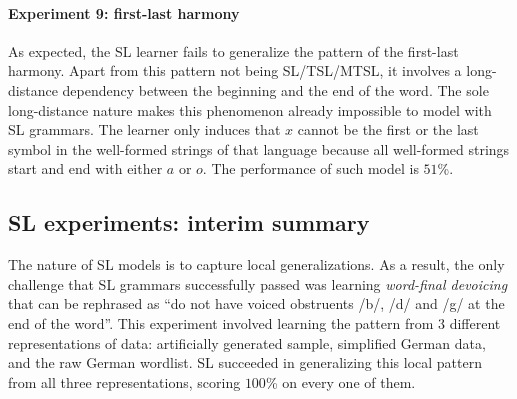 \paragraph{Experiment 9: first-last harmony}

As expected, the SL learner fails to generalize the pattern of the first-last harmony.
Apart from this pattern not being SL/TSL/MTSL, it involves a long-distance dependency between the beginning and the end of the word.
The sole long-distance nature makes this phenomenon already impossible to model with SL grammars.
The learner only induces that $x$ cannot be the first or the last symbol in the well-formed strings of that language because all well-formed strings start and end with either $a$ or $o$.
The performance of such model is $51$\%.

\begin{table}[h!]
\centering
{}
\caption{SL learning of first-last harmony; abstract representation.}
\end{table}


\subsection{SL experiments: interim summary}

The nature of SL models is to capture local generalizations.
As a result, the only challenge that SL grammars successfully passed was learning \emph{word-final devoicing} that can be rephrased as ``do not have voiced obstruents /b/, /d/ and /g/ at the end of the word''.
This experiment involved learning the pattern from $3$ different representations of data: artificially generated sample, simplified German data, and the raw German wordlist.
SL succeeded in generalizing this local pattern from all three representations, scoring $100$\% on every one of them.

